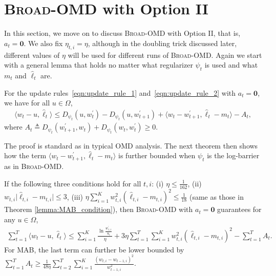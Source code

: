 \documentclass[final, 12pt]{colt2018} %
\newcommand{\p}{\prime}
\newcommand{\inn}[1]{ \langle {#1} \rangle }
\newcommand{\abs}[1]{ \lvert {#1} \rvert }
\begin{document}
\section{\textsc{Broad-OMD} with Option II}
\label{section:Option II}

In this section, we move on to discuss \textsc{Broad-OMD} with Option II, that is, $a_t = \mathbf{0}$. 
We also fix $\eta_{t,i} = \eta$, although in the doubling trick discussed later, different values of $\eta$ will be used for different runs of  \textsc{Broad-OMD}.
Again we start with a general lemma that holds no matter what regularizer $\psi_t$ is used and what $m_t$ and $\hat{\ell}_t$ are.

\begin{lemma}
\label{lemma:simple_lemma}
For the update rules~\eqref{eqn:update_rule_1} and~\eqref{eqn:update_rule_2} with $a_t=\mathbf{0}$, we have for all $u\in \Omega$, 
\begin{align*}
\inn{w_t-u, \hat{\ell}_t}\leq D_{\psi_t}(u,w_t^\p)-D_{\psi_t}(u,w^\p_{t+1})+\inn{w_t-w_{t+1}^\p, \hat{\ell}_t-m_t}-A_t, 
\end{align*}
where $A_t\triangleq D_{\psi_t}(w_{t+1}^\p, w_t)+D_{\psi_t}(w_t, w_t^\p)\geq 0$.
\end{lemma}

The proof is standard as in typical OMD analysis. The next theorem then shows how the term $\inn{w_t-w_{t+1}^\p, \hat{\ell}_t-m_t}$ is further bounded
when $\psi_t$ is the log-barrier as in \textsc{Broad-OMD}. 

\begin{theorem}
\label{lemma:second_order_regret_bound}
If the following three conditions hold for all $t,i$: 
(i) $\eta \leq \frac{1}{162}$,
(ii) $w_{t,i}\abs{\hat{\ell}_{t,i}-m_{t,i}}\leq 3$,
(iii) $\eta\sum_{i=1}^K w_{t,i}^2(\hat{\ell}_{t,i}-m_{t,i})^2\leq \frac{1}{18}$
(same as those in Theorem \ref{lemma:MAB_condition}), %
then \textsc{Broad-OMD} with $a_t=\mathbf{0}$ guarantees for any $u\in \Omega$, 
\begin{align}
\sum_{t=1}^T \inn{w_t-u, \hat{\ell}_t}\leq \sum_{i=1}^K  \frac{\ln \frac{w^\p_{1,i}}{u_i}}{\eta}  +3\eta\sum_{t=1}^T\sum_{i=1}^K w_{t,i}^2(\hat{\ell}_{t,i}-m_{t,i})^2-\sum_{t=1}^T A_t. \label{eqn:second_order_regret_bound}
\end{align}
For MAB, the last term can further be lower bounded by $\sum_{t=1}^T A_t \geq \frac{1}{48\eta}\sum_{t=2}^T \sum_{i=1}^K\frac{(w_{t,i}-w_{t-1,i})^2}{w_{t-1,i}^2}$.
\end{theorem}
\end{document}
